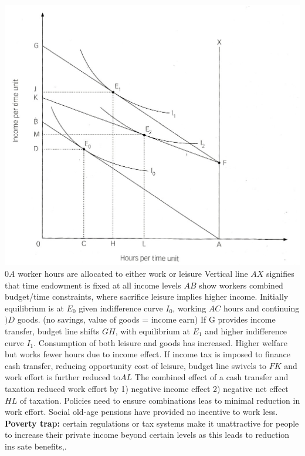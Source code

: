 \documentclass[12pt]{examnotes}
\begin{document}
\includegraphics[scale=0.3]{./imgs/83.jpg} 
\ra $0A$ worker hours are allocated to either work or leisure
\ra Vertical line $AX$ signifies that time endowment is fixed at all income levels
\ra $AB$ show workers combined budget/time constraints, where sacrifice leisure implies higher income.
\ra Initially equilibrium is at $E_0$ given indifference curve $I_0$, working $AC$ hours and continuing $)D$ goods. (no savings, value of goods = income earn)
\ra If G provides income transfer, budget line shifts $GH$, with equilibrium at $E_1$ and higher indifference curve $I_1$. Consumption of both leisure and goods has increased. Higher welfare but works fewer hours due to income effect.
\ra If income tax is imposed to finance cash transfer, reducing opportunity cost of leisure, budget line swivels to $FK$ and work effort is further reduced to$AL$
\ra The combined effect of a cash transfer and taxation reduced work effort by 1) negative income effect 2) negative net effect $HL$ of taxation.
\ra Policies need to ensure combinations leas to minimal reduction in work effort. Social old-age pensions have provided no incentive to work less.
\vspace{6pt}
{\bf Poverty trap:} certain regulations or tax systems make it unattractive for people to increase their private income beyond certain levels as this leads to reduction ins sate benefits,.
\end{document}
